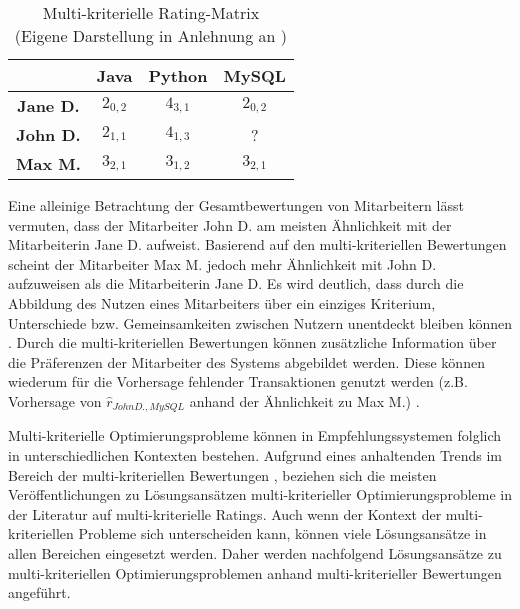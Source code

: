 \begin{table}[htbp]
    \begin{center}
    \begin{tabular}{|c||c|c|c|}
    \hline
    {} & {\textbf{Java}} & {\textbf{Python}} & {\textbf{MySQL}}\\
    \hline
    \hline
    \textbf{Jane D.} & $2_{0,2}$ & $4_{3,1}$ & $2_{0,2}$ \\
    \hline
    \textbf{John D.} & $2_{1,1}$ & $4_{1,3}$ & ? \\
    \hline
    \textbf{Max M.} & $3_{2,1}$ & $3_{1,2}$ & $3_{2,1}$ \\
    \hline
    \end{tabular}
    \end{center}
    \caption[Multi-kriterielle Rating-Matrix ]{Multi-kriterielle Rating-Matrix \\
    (Eigene Darstellung in Anlehnung an \cite[S. 51]{adomavicius:inproceedings:2})}
	\label{tab3}
\end{table}

Eine alleinige Betrachtung der Gesamtbewertungen von Mitarbeitern lässt vermuten, dass der Mitarbeiter John D. am meisten Ähnlichkeit mit der Mitarbeiterin Jane D. aufweist.
Basierend auf den multi-kriteriellen Bewertungen scheint der Mitarbeiter Max M. jedoch mehr Ähnlichkeit mit John D. aufzuweisen als die Mitarbeiterin Jane D.
Es wird deutlich, dass durch die Abbildung des Nutzen eines Mitarbeiters über ein einziges Kriterium, Unterschiede bzw. Gemeinsamkeiten zwischen Nutzern unentdeckt bleiben können \cite[S. 854]{adomavicius:4:inbook}.
Durch die multi-kriteriellen Bewertungen können zusätzliche Information über die Präferenzen der Mitarbeiter des Systems abgebildet werden.
Diese können wiederum für die Vorhersage fehlender Transaktionen genutzt werden (z.B. Vorhersage von $\hat{r}_{John D., MySQL}$ anhand der Ähnlichkeit zu Max M.) \cite[S. 848]{adomavicius:4:inbook}.

Multi-kriterielle Optimierungsprobleme können in Empfehlungssystemen folglich in unterschiedlichen Kontexten bestehen.
Aufgrund eines anhaltenden Trends im Bereich der multi-kriteriellen Bewertungen \cite[S. 851]{adomavicius:4:inbook}, beziehen sich die meisten Veröffentlichungen zu Lösungsansätzen multi-kriterieller Optimierungsprobleme in der Literatur auf multi-kriterielle Ratings.
Auch wenn der Kontext der multi-kriteriellen Probleme sich unterscheiden kann, können viele Lösungsansätze in allen Bereichen eingesetzt werden.
Daher werden nachfolgend Lösungsansätze zu multi-kriteriellen Optimierungsproblemen anhand multi-kriterieller Bewertungen angeführt.

